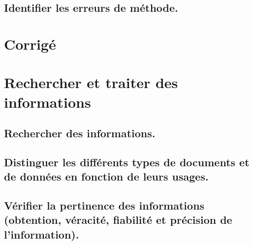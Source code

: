 \documentclass[10pt,fleqn]{article}
\newcommand{\repRel}{../..}
\begin{document}
\subsection{Identifier les erreurs de méthode.} 

\begin{multicols}{2} 

\end{multicols}

\proftrue
\setcounter{numexo}{0}

\section{Corrigé} 

\proffalse
\newpage
\def\xxchapitre{Communiquer}
\def\xxactivite{E}
\setcounter{section}{0}
\setcounter{numexo}{0}


\section{Rechercher et traiter des informations} 

\subsection{Rechercher des informations.} 

\begin{multicols}{2} 

\end{multicols}

\subsection{Distinguer les différents types de documents et de données en fonction de leurs usages.} 

\begin{multicols}{2} 

\end{multicols}

\subsection{Vérifier la pertinence des informations (obtention, véracité, fiabilité et précision de l'information).} 

\begin{multicols}{2} 

\end{multicols}
\end{document}
